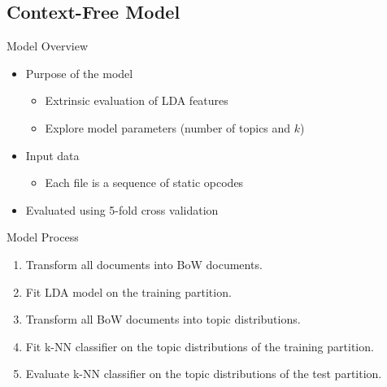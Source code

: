 \documentclass[handout,11pt]{beamer}
\begin{document}
	\subsection{Context-Free Model}
	\begin{frame}{Model Overview}
		\begin{itemize}
			\item Purpose of the model
				\begin{itemize}
					\item Extrinsic evaluation of LDA features
					\item Explore model parameters (number of topics and $k$)
				\end{itemize}
			\item Input data
				\begin{itemize}
					\item Each file is a sequence of static opcodes
				\end{itemize}
			\item Evaluated using 5-fold cross validation
		\end{itemize}
	\end{frame}
	\begin{frame}{Model Process}
		\begin{enumerate}
			\item Transform all documents into BoW documents.
			\item Fit LDA model on the training partition.
			\item Transform all BoW documents into topic distributions.
			\item Fit k-NN classifier on the topic distributions of the training
				partition.
			\item Evaluate k-NN classifier on the topic distributions of the test
				partition.
		\end{enumerate}
	\end{frame}
\end{document}
